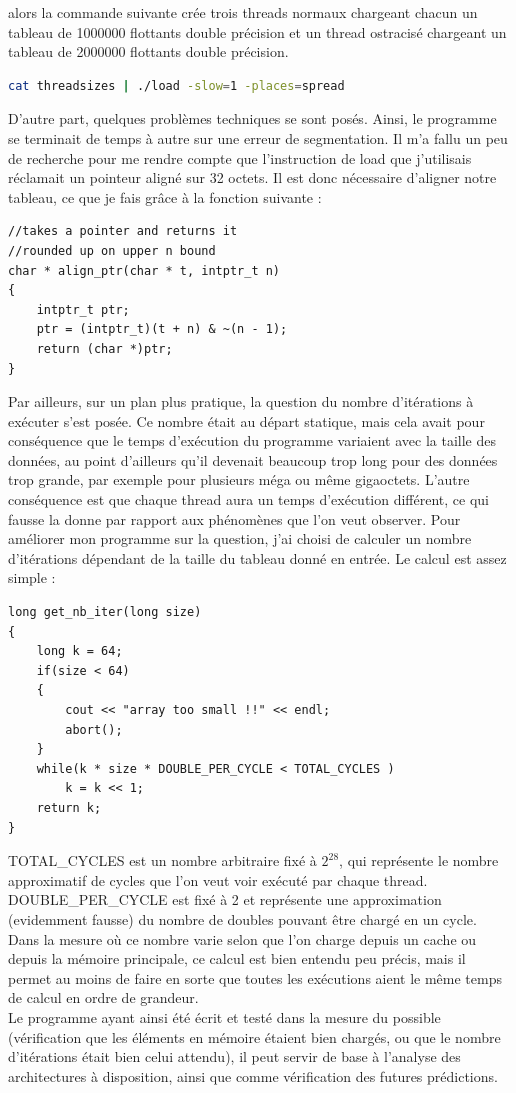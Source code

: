 \documentclass{report}
\begin{document}
alors la commande suivante crée trois threads normaux chargeant chacun un tableau de 1000000 flottants
double précision et un thread ostracisé chargeant un tableau de 2000000 flottants double précision.
\begin{lstlisting}[language=bash]
cat threadsizes | ./load -slow=1 -places=spread
\end{lstlisting}
D'autre part, quelques problèmes techniques se sont posés. Ainsi, le programme se terminait de temps à 
autre sur une erreur de segmentation. Il m'a fallu un peu de recherche pour me rendre compte que 
l'instruction de load que j'utilisais réclamait un pointeur aligné sur 32 octets. Il est donc 
nécessaire d'aligner notre tableau, ce que je fais grâce à la fonction suivante : 
\begin{lstlisting}
//takes a pointer and returns it
//rounded up on upper n bound
char * align_ptr(char * t, intptr_t n)
{
	intptr_t ptr;
	ptr = (intptr_t)(t + n) & ~(n - 1);
	return (char *)ptr;
}
\end{lstlisting}
Par ailleurs, sur un plan plus pratique, la question du nombre d'itérations à exécuter s'est posée. Ce 
nombre était au départ statique, mais cela avait pour conséquence que le temps d'exécution du programme
variaient avec la taille des données, au point d'ailleurs qu'il devenait beaucoup trop long pour des 
données trop grande, par exemple pour plusieurs méga ou même gigaoctets. L'autre conséquence est 
que chaque thread aura un temps d'exécution différent, ce qui fausse la donne par rapport aux
phénomènes que l'on veut observer. Pour améliorer mon programme sur la question, j'ai choisi 
de calculer un nombre d'itérations dépendant de la taille du tableau donné en entrée. Le 
calcul est assez simple : 
\begin{lstlisting}
long get_nb_iter(long size)
{
	long k = 64;
	if(size < 64)
	{
		cout << "array too small !!" << endl;
		abort();
	}
	while(k * size * DOUBLE_PER_CYCLE < TOTAL_CYCLES )
		k = k << 1;
	return k;
}
\end{lstlisting}
TOTAL\_CYCLES est un nombre arbitraire fixé à $2^{28}$, qui représente le nombre approximatif de cycles
que l'on veut voir exécuté par chaque thread. DOUBLE\_PER\_CYCLE est fixé à 2 et représente une 
approximation (evidemment fausse) du nombre de doubles pouvant être chargé en un cycle. Dans la mesure
où ce nombre varie selon que l'on charge depuis un cache ou depuis la mémoire principale, ce calcul
est bien entendu peu précis, mais il permet au moins de faire en sorte que toutes les exécutions aient
le même temps de calcul en ordre de grandeur. 
\\Le programme ayant ainsi été écrit et testé dans la mesure du possible (vérification que les éléments
en mémoire étaient bien chargés, ou que le nombre d'itérations était bien celui attendu), il peut 
servir de base à l'analyse des architectures à disposition, ainsi que comme vérification des futures
prédictions. 
\end{document}
